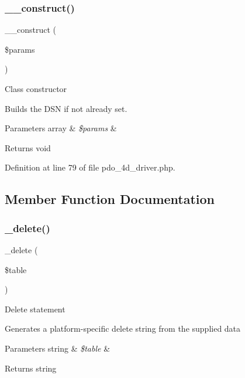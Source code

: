 \subsubsection{\texorpdfstring{\_\_construct()}{\_\_construct()}}
{\footnotesize\ttfamily \+\_\+\+\_\+construct (\begin{DoxyParamCaption}\item[{}]{\$params }\end{DoxyParamCaption})}

Class constructor

Builds the D\+SN if not already set.


\begin{DoxyParams}[1]{Parameters}
array & {\em \$params} & \\
\hline
\end{DoxyParams}
\begin{DoxyReturn}{Returns}
void 
\end{DoxyReturn}


Definition at line 79 of file pdo\+\_\+4d\+\_\+driver.\+php.



\subsection{Member Function Documentation}
\mbox{\label{class_c_i___d_b__pdo__4d__driver_a133ea8446ded52589bd22cc9163d0896}} 
\subsubsection{\texorpdfstring{\_delete()}{\_delete()}}
{\footnotesize\ttfamily \+\_\+delete (\begin{DoxyParamCaption}\item[{}]{\$table }\end{DoxyParamCaption})\hspace{0.3cm}{\ttfamily [protected]}}

Delete statement

Generates a platform-\/specific delete string from the supplied data


\begin{DoxyParams}[1]{Parameters}
string & {\em \$table} & \\
\hline
\end{DoxyParams}
\begin{DoxyReturn}{Returns}
string 
\end{DoxyReturn}


